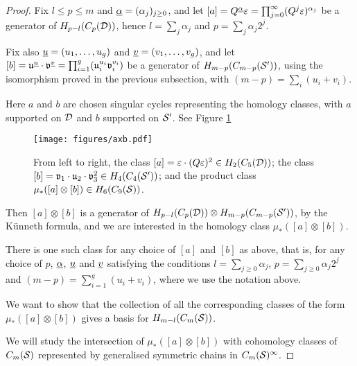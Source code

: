 \begin{proof}
Fix $l\leq p\leq m$ and $\ualpha=(\alpha_j)_{j\geq 0}$, and let $[a]=Q^{\ualpha}\epsilon=\prod_{j=0}^{\infty}(Q^j\epsilon)^{\alpha_j}$ be a generator of
$H_{p-l}(C_p(\D))$, hence $l=\sum_j\alpha_j$ and $p=\sum_j\alpha_j2^j$.

Fix also $\uu=(u_1,\dots, u_g)$ and $\uv=(v_1,\dots,v_g)$,
and let $[b]=\u^{\uu}\cdot\v^{\uv}=\prod_{i=1}^g (\u_i^{u_i}\v_i^{v_i})$ be a generator of $H_{m-p}(C_{m-p}(\S'))$, using the
isomorphism proved in the previous subsection, with $(m-p)=\sum_i(u_i+v_i)$.

Here $a$ and
$b$ are chosen singular cycles representing the homology classes, with $a$ supported on $\D$
and $b$ supported on $\S'$. See Figure \ref{fig:axb}

\begin{figure}\centering
 \texttt{[image: figures/axb.pdf]}
 \caption{From left to right, the class $[a]=\epsilon\cdot(Q\epsilon)^2\in H_2(C_5(\D))$;
 the class $[b]=\v_1\cdot\u_2\cdot\v_3^2\in H_4(C_4(\S'))$; and the product class
 $\mu_*([a]\otimes[b])\in H_6(C_9(\S))$.}
\label{fig:axb}
\end{figure}

Then $[a]\otimes [b]$ is a generator of $H_{p-l}(C_p(\D))\otimes H_{m-p}(C_{m-p}(\S'))$,
by the K\"unneth formula, and we are interested in the homology class $\mu_*([a]\otimes [b])$.

There is one such
class for any choice of $[a]$ and $[b]$ as above, that is, for any choice of
$p$, $\ualpha$, $\uu$ and $\uv$ satisfying the conditions
$l=\sum_{j\geq 0}\alpha_j$, $p=\sum_{j\geq 0}\alpha_j2^j$ and $(m-p)=\sum_{i=1}^g(u_i+v_i)$, where
we use the notation above.

We want to show that the collection of all the corresponding classes of the form $\mu_*([a]\otimes [b])$
gives a basis for $H_{m-l}(\cms)$.

We will study
the intersection of $\mu_*([a]\otimes [b])$ with cohomology classes of $\cms$ represented by
generalised symmetric chains in $\cms^{\infty}$.





\end{proof}

